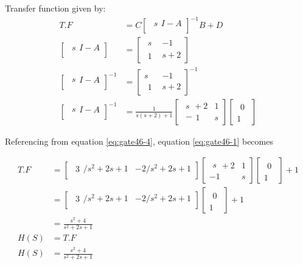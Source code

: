 \documentclass[12pt]{article}
\newcommand{\myvec}[1]{\begin{matrix} #1 \end{matrix}}
\begin{document}
Transfer function given by:
\begin{align}
T.F &= C\begin{bmatrix} \myvec sI-A  \\    \end{bmatrix}^{-1}B + D\label{eq:gate46-1}\\
\begin{bmatrix} \myvec sI-A  \\    \end{bmatrix}&= \begin{bmatrix}\myvec s & -1 \\ \myvec 1  & s+2 \end{bmatrix}\label{eq:gate46-2}\\
\begin{bmatrix} \myvec sI - A \\   \end{bmatrix}^{-1}&=\begin{bmatrix} s & -1\\ \myvec 1& s+2 \end{bmatrix}^{-1}\label{eq:gate46-3}\\
\begin{bmatrix} \myvec sI - A \\   \end{bmatrix}^{-1}&=\frac{1}{s(s+2)+1}\begin{bmatrix} \myvec s+2 & 1 \\ \myvec -1 & s \end{bmatrix}\begin{bmatrix} \myvec 0 \\ 1 \label{eq:gate46-4} \end{bmatrix}
\end{align}
\vspace{1cm}

 Referencing from equation \eqref{eq:gate46-4}, equation \eqref{eq:gate46-1} becomes 

\begin{align}
T.F&=\begin{bmatrix} \myvec 3/s^2+2s+1 & -2/s^2+2s+1 \\  \end{bmatrix}  
\begin{bmatrix} \myvec s+2 & 1 \\  -1 & s \end{bmatrix}\begin{bmatrix} \myvec 0 \\ 1 \end{bmatrix} +1 \\
&=\begin{bmatrix} \myvec 3/s^2+2s+1 & -2/s^2+2s+1  \\ \end{bmatrix}\begin{bmatrix}
\myvec 0\\ 1 \end{bmatrix}+1\\
&=\frac{s^2 + 4}{s^2 + 2s + 1}\\
H(S)&=T.F\\
H(S)&=\frac{s^2 + 4}{s^2+2s+1}\label{eq:gate46-8}
\end{align}
\end{document}

